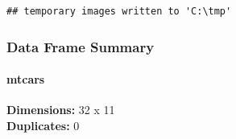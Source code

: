 \documentclass[
]{article}
\begin{document}
\begin{verbatim}
## temporary images written to 'C:\tmp'
\end{verbatim}

\hypertarget{data-frame-summary}{%
\subsubsection{Data Frame Summary}\label{data-frame-summary}}

\hypertarget{mtcars}{%
\paragraph{mtcars}\label{mtcars}}

\textbf{Dimensions:} 32 x 11\\
\textbf{Duplicates:} 0
\end{document}
